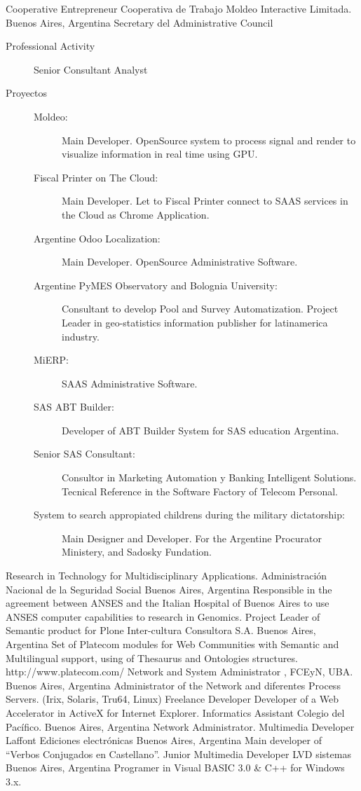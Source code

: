 	{Cooperative Entrepreneur}
	{Cooperativa de Trabajo Moldeo Interactive Limitada.}
	{Buenos Aires, Argentina}
	{Secretary del Administrative Council}
	{\begin{description}
	\item [Professional Activity] Senior Consultant Analyst
	\item [Proyectos]
	\begin{description}
		\item [Moldeo:] Main Developer. OpenSource system to process signal and render to visualize information in real time using GPU.
		\item [Fiscal Printer on The Cloud:] Main Developer. Let to Fiscal Printer connect to SAAS services in the Cloud as Chrome Application.
		\item [Argentine Odoo Localization:] Main Developer. OpenSource Administrative Software.
		\item [Argentine PyMES Observatory and Bolognia University:] Consultant to develop Pool and Survey Automatization. Project Leader in geo-statistics information publisher for latinamerica industry.
		\item [MiERP:] SAAS Administrative Software.
		\item [SAS ABT Builder:] Developer of ABT Builder System for SAS education Argentina.
		\item [Senior SAS Consultant:] Consultor in Marketing Automation y Banking Intelligent Solutions. Tecnical Reference in the Software Factory of Telecom Personal.
		\item [System to search appropiated childrens during the military dictatorship:] Main Designer and Developer. For the Argentine Procurator Ministery, and Sadosky Fundation.
	\end{description}
	\end{description}}
	{Research in Technology for Multidisciplinary Applications.}
	{Administración Nacional de la Seguridad Social}
	{Buenos Aires, Argentina}
	{}
	{Responsible in the agreement between ANSES and the Italian Hospital of Buenos Aires to use ANSES computer capabilities to research in Genomics.}
	{Project Leader of Semantic product for Plone}
	{Inter-cultura Consultora S.A.}
	{Buenos Aires, Argentina}
	{}
	{Set of Platecom modules for Web Communities with Semantic and Multilingual support, using of Thesaurus and Ontologies structures.  http://www.platecom.com/}
	{Network and System Administrator}
	{\UBA, FCEyN, UBA.}
	{Buenos Aires, Argentina}
	{}
	{Administrator of the Network and diferentes Process Servers. (Irix, Solaris, Tru64, Linux)}
	{Freelance Developer}
	{}
	{}
	{}
	{Developer of a Web Accelerator in ActiveX for Internet Explorer.}
	{Informatics Assistant}
	{Colegio del Pacífico.}
	{Buenos Aires, Argentina}
	{}
	{Network Administrator. }
	{Multimedia Developer}
	{Laffont Ediciones electrónicas}
	{Buenos Aires, Argentina}
	{}
	{Main developer of ``Verbos Conjugados en Castellano''.}
	{Junior Multimedia Developer}
	{LVD sistemas}
	{Buenos Aires, Argentina}
	{}
	{Programer in Visual BASIC 3.0 \& C++ for Windows 3.x.}
\label{profesional:hasta}

